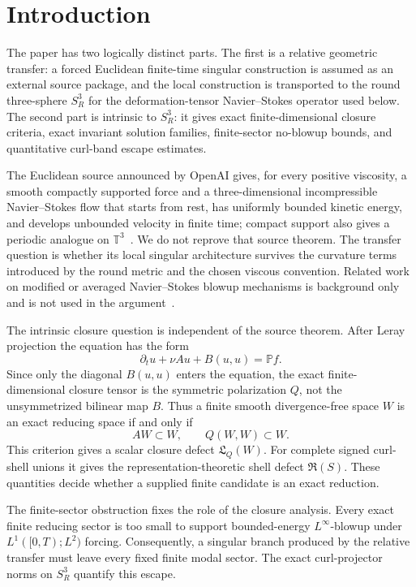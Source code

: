 \documentclass[aps,prd,reprint,superscriptaddress,nofootinbib,floatfix]{revtex4-2}
\theoremstyle{definition}
\theoremstyle{remark}
\newcommand{\PP}{\mathbb{P}}
\begin{document}
\maketitle

\section{Introduction}

The paper has two logically distinct parts.  The first is a relative geometric
transfer: a forced Euclidean finite-time singular construction is assumed as an
external source package, and the local construction is transported to the round
three-sphere \(S^3_R\) for the deformation-tensor Navier--Stokes operator used
below.  The second part is intrinsic to \(S^3_R\): it gives exact
finite-dimensional closure criteria, exact invariant solution families,
finite-sector no-blowup bounds, and quantitative curl-band escape estimates.

The Euclidean source announced by OpenAI gives, for every positive viscosity, a
smooth compactly supported force and a three-dimensional incompressible
Navier--Stokes flow that starts from rest, has uniformly bounded kinetic
energy, and develops unbounded velocity in finite time; compact support also
gives a periodic analogue on \(\mathbb T^3\)~\cite{OpenAI2026Paper,OpenAI2026Repo}.
We do not reprove that source theorem.  The transfer question is whether its
local singular architecture survives the curvature terms introduced by the
round metric and the chosen viscous convention.  Related work on modified or
averaged Navier--Stokes blowup mechanisms is background only and is not used in
the argument~\cite{Tao2016}.

The intrinsic closure question is independent of the source theorem.  After
Leray projection the equation has the form
\[
	\partial_tu+\nu Au+B(u,u)=\PP f.
\]
Since only the diagonal \(B(u,u)\) enters the equation, the exact
finite-dimensional closure tensor is the symmetric polarization \(Q\), not the
unsymmetrized bilinear map \(B\).  Thus a finite smooth divergence-free space
\(W\) is an exact reducing space if and only if
\[
	AW\subset W,\qquad Q(W,W)\subset W.
\]
This criterion gives a scalar closure defect \(\mathfrak L_Q(W)\).  For
complete signed curl-shell unions it gives the representation-theoretic shell
defect \(\mathfrak R(S)\).  These quantities decide whether a supplied finite
candidate is an exact reduction.

The finite-sector obstruction fixes the role of the closure analysis.  Every
exact finite reducing sector is too small to support bounded-energy
\(L^\infty\)-blowup under \(L^1([0,T);L^2)\) forcing.  Consequently, a
singular branch produced by the relative transfer must leave every fixed finite
modal sector.  The exact curl-projector norms on \(S^3_R\) quantify this
escape.
\end{document}

